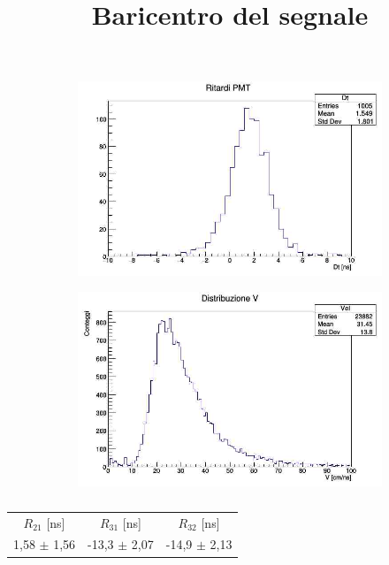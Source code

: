 \documentclass[a4paper,twocolumn]{article}
\begin{document}
\begin{figure}[H]
     \centering
     \title{Baricentro del segnale}
     \begin{center}
     \begin{subfigure}[b]{0.4\textwidth}
         \centering
         \includegraphics[width=\textwidth]{./immagini/TimeOfFlight/Rit21IntSinTot.jpg}
         \caption{}
         \label{fig:Dt21IntSigTot}
     \end{subfigure}
     \hfill
     \begin{subfigure}[b]{0.4\textwidth}
         \centering
         \includegraphics[width=\textwidth]{./immagini/TimeOfFlight/VIntSigTot.jpg}
         \caption{}
         \label{fig:VIntSinTot}
     \end{subfigure}
     \end{center}
     \caption{}        
     \label{fig:IntSinTot}
\end{figure}

\begin{table}[H]
\begin{tabular}{c|c|c}
$R_{21}$ [ns] & $R_{31}$ [ns] & $R_{32}$ [ns] \\
\hfill
1,58 $\pm$ 1,56 & -13,3 $\pm$ 2,07 & -14,9 $\pm$ 2,13
\hfill
\end{tabular}
\caption{}
\label{tab:RitIntSigTot}
\end{table}
\end{document}
